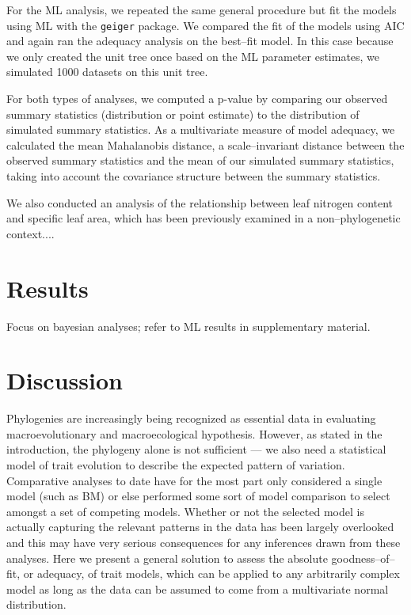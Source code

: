 \documentclass[a4paper,12pt]{article}
\begin{document}
For the ML analysis, we repeated the same general procedure but fit the models using ML with the \texttt{geiger} \citep{geiger} package. We compared the fit of the models using AIC \citep{Akaike1974} and again ran the adequacy analysis on the best--fit model. In this case because we only created the unit tree once based on the ML parameter estimates, we simulated 1000 datasets on this unit tree. 

For both types of analyses, we computed a p-value by comparing our observed summary statistics (distribution or point estimate) to the distribution of simulated summary statistics. As a multivariate measure of model adequacy, we calculated the mean Mahalanobis distance, a scale--invariant distance between the observed summary statistics and the mean of our simulated summary statistics, taking into account the covariance structure between the summary statistics.

We also conducted an analysis of the relationship between leaf nitrogen content and specific leaf area, which has been previously examined in a non--phylogenetic context....

\section*{Results}

Focus on bayesian analyses; refer to ML results in supplementary material.

\section*{Discussion}

Phylogenies are increasingly being recognized as essential data in evaluating macroevolutionary and macroecological hypothesis. However, as stated in the introduction, the phylogeny alone is not sufficient --- we also need a statistical model of trait evolution to describe the expected pattern of variation. Comparative analyses to date have for the most part only considered a single model (such as BM) or else performed some sort of model comparison to select amongst a set of competing models. Whether or not the selected model is actually capturing the relevant patterns in the data has been largely overlooked and this may have very serious consequences for any inferences drawn from these analyses. Here we present a general solution to assess the absolute goodness--of--fit, or adequacy, of trait models, which can be applied to any arbitrarily complex model as long as the data can be assumed to come from a multivariate normal distribution.
\end{document}
